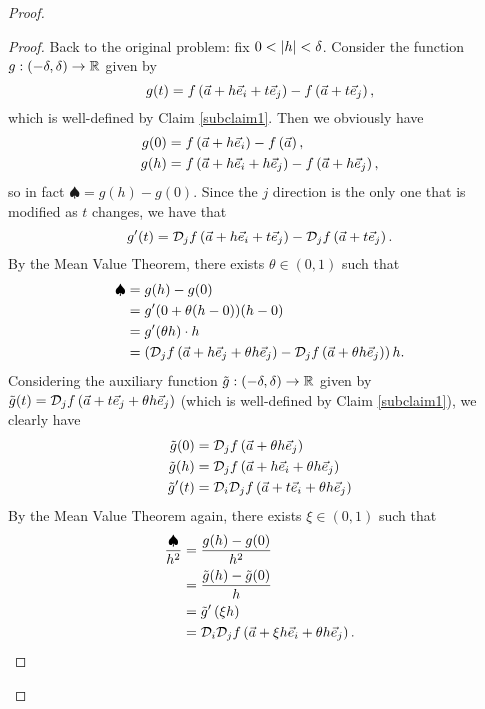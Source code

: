 \documentclass[main.tex]{subfiles}
\begin{document}
\begin{proof}
\begin{proof}
        Back to the original problem: fix $0 < \left\lvert h \right\rvert < \delta$. Consider the function $g : (-\delta, \delta) \to \mathbb R$ given by
        \[g(t) = f\left( \vec{a} + h\vec{e}_i + t\vec{e}_j \right) - f\left( \vec{a} + t\vec{e}_j \right),\]
        which is well-defined by Claim \ref{subclaim1}. Then we obviously have
        \begin{align*}
            g(0) &= f\left( \vec{a} + h\vec{e}_i \right) - f\left( \vec{a} \right), \\
            g(h) &= f\left( \vec{a} + h\vec{e}_i + h\vec{e}_j \right) - f\left( \vec{a} + h\vec{e}_j \right),
        \end{align*}
        so in fact $\spadesuit = g(h) - g(0)$. Since the $j$ direction is the only one that is modified as $t$ changes, we have that
        \[g'(t) = \mathcal{D}_jf\left( \vec{a} + h\vec{e}_i + t\vec{e}_j \right) - \mathcal{D}_jf\left( \vec{a} + t\vec{e}_j \right).\]
        By the Mean Value Theorem, there exists $\theta\in (0, 1)$ such that
        \begin{align*}
            \spadesuit &= g(h) - g(0) \\
            &= g'(0 + \theta(h - 0))(h - 0) \\
            &= g'(\theta h) \cdot h \\
            &= \left( \mathcal{D}_jf\left( \vec{a} + h\vec{e}_j + \theta h\vec{e}_j \right) - \mathcal{D}_jf\left( \vec{a} + \theta h \vec{e}_j \right) \right)h.
        \end{align*}
        Considering the auxiliary function $\tilde{g} : (-\delta, \delta) \to \mathbb R$ given by $\tilde{g}(t) = \mathcal{D}_jf\left( \vec{a} + t\vec{e}_j + \theta h\vec{e}_j \right)$ (which is well-defined by Claim \ref{subclaim1}), we clearly have
        \begin{align*}
            \tilde{g}(0) &= \mathcal{D}_jf\left( \vec{a} + \theta h \vec{e}_j \right) \\
            \tilde{g}(h) &= \mathcal{D}_jf\left( \vec{a} + h\vec{e}_i + \theta h \vec{e}_j \right) \\
            \tilde{g}'(t) &= \mathcal{D}_i\mathcal{D}_jf\left( \vec{a} + t\vec{e}_i + \theta h \vec{e}_j \right)
        \end{align*}
        By the Mean Value Theorem again, there exists $\xi \in (0, 1)$ such that
        \begin{align*}
            \frac{\spadesuit}{h^2} &= \frac{g(h) - g(0)}{h^2} \\
            &= \frac{\tilde{g}(h) - \tilde{g}(0)}{h} \\
            &= \tilde{g}'\parens{\xi h} \\
            &= \mathcal{D}_i\mathcal{D}_j f\parens{\va + \xi h\vec{e}_i + \theta h \vec{e}_j}.

\end{align*}
\end{proof}
\end{proof}
\end{document}
